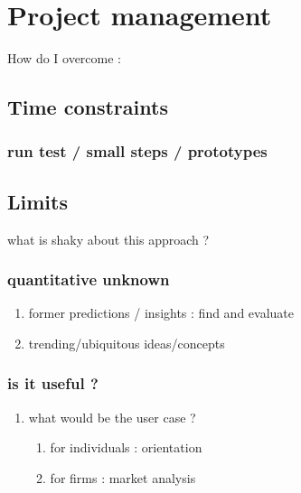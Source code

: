 \documentclass[11pt]{article}
\begin{document}
\section{Project management}
\label{sec:orgf989d49}
How do I overcome :
\subsection{Time constraints}
\label{sec:org2fddd20}
\subsubsection{run test / small steps / prototypes}
\label{sec:orga033b4b}
\subsection{Limits}
\label{sec:orgf8fa20f}
what is shaky about this approach ?
\subsubsection{quantitative unknown}
\label{sec:org5fde9bc}
\begin{enumerate}
\item former predictions / insights : find and evaluate
\label{sec:orga0882df}
\item trending/ubiquitous ideas/concepts
\label{sec:org083e223}
\end{enumerate}
\subsubsection{is it useful ?}
\label{sec:org486e809}
\begin{enumerate}
\item what would be the user case ?
\label{sec:org97abe9c}
\begin{enumerate}
\item for individuals : orientation
\label{sec:org1f37c4b}
\item for firms : market analysis
\label{sec:org2e026ee}
\end{enumerate}
\end{enumerate}
\end{document}

